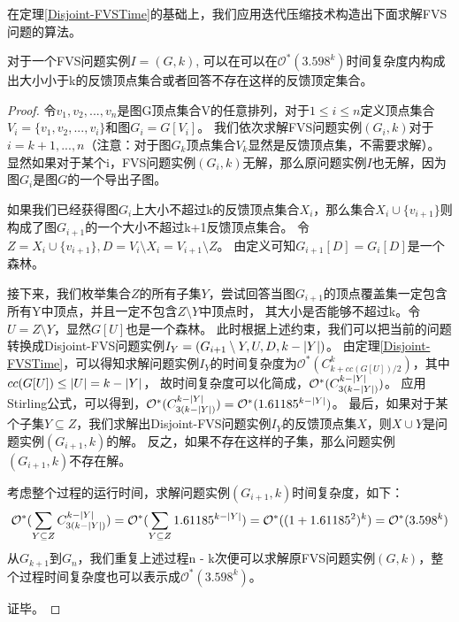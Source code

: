 在定理\ref{Disjoint-FVSTime}的基础上，我们应用迭代压缩技术构造出下面求解FVS问题的算法。
\begin{theorem}
对于一个FVS问题实例$I = (G, k)$, 可以在可以在$\mathcal{O}^*(3.598^k)$时间复杂度内构成出大小小于k的反馈顶点集合或者回答不存在这样的反馈顶定集合。
\end{theorem}
\begin{proof}
令$v_1, v_2, ..., v_n$是图G顶点集合V的任意排列，对于$1 \le i \le n$定义顶点集合$V_i = \{v_1, v_2, ..., v_i\}$和图$G_i = G[V_i]$。
我们依次求解FVS问题实例$(G_i, k)$对于$i = k+1, ..., n$（注意：对于图$G_k$顶点集合$V_k$显然是反馈顶点集，不需要求解）。
显然如果对于某个i，FVS问题实例$(G_i, k)$无解，那么原问题实例$I$也无解，因为图$G_i$是图$G$的一个导出子图。

如果我们已经获得图$G_i$上大小不超过k的反馈顶点集合$X_i$，那么集合$X_i \cup \{v_{i+1}\}$则构成了图$G_{i+1}$的一个大小不超过k+1反馈顶点集合。
令$Z = X_i \cup \{v_{i+1}\}, D = V_i \setminus X_i = V_{i+1} \setminus Z$。
由定义可知$G_{i+1}[D] = G_i[D]$是一个森林。

接下来，我们枚举集合$Z$的所有子集$Y$，尝试回答当图$G_{i+1}$的顶点覆盖集一定包含所有Y中顶点，并且一定不包含$Z \setminus Y$中顶点时，
其大小是否能够不超过k。令$U = Z \setminus Y$，显然$G[U]$也是一个森林。
此时根据上述约束，我们可以把当前的问题转换成Disjoint-FVS问题实例$I_Y = (G_{i+1} \setminus Y, U, D, k-\left\vert Y \right\vert)$。
由定理\ref{Disjoint-FVSTime}，可以得知求解问题实例$I_Y$的时间复杂度为$\mathcal{O}^*(C^k_{k + cc(G[U])/2})$，其中$cc(G[U]) \le \left\vert U \right\vert = k - \left\vert Y \right\vert$，
故时间复杂度可以化简成，$\mathcal{O}^*(C^{k - \left\vert Y \right\vert}_{3(k - \left\vert Y \right\vert)})$。
应用Stirling公式，可以得到，$\mathcal{O}^*(C^{k - \left\vert Y \right\vert}_{3(k - \left\vert Y \right\vert)}) = \mathcal{O}^*(1.61185^{k - \left\vert Y \right\vert})$。
最后，如果对于某个子集$Y \subseteq Z$，我们求解出Disjoint-FVS问题实例$I_Y$的反馈顶点集$X$，则$X \cup Y$是问题实例$(G_{i+1}, k)$的解。
反之，如果不存在这样的子集，那么问题实例$(G_{i+1}, k)$不存在解。

考虑整个过程的运行时间，求解问题实例$(G_{i+1}, k)$时间复杂度，如下：
\begin{equation*}
  \mathcal{O}^*(\sum_{Y \subseteq Z}C^{k - \left\vert Y \right\vert}_{3(k - \left\vert Y \right\vert)}) \\
   = \mathcal{O}^*(\sum_{Y \subseteq Z}1.61185^{k - \left\vert Y \right\vert})
   = \mathcal{O}^*((1 + 1.61185^2)^k) = \mathcal{O}^*(3.598^k)
\end{equation*}
从$G_{k+1}$到$G_n$，我们重复上述过程n - k次便可以求解原FVS问题实例$(G, k)$，整个过程时间复杂度也可以表示成$\mathcal{O}^*(3.598^k)$。

证毕。
\end{proof}

